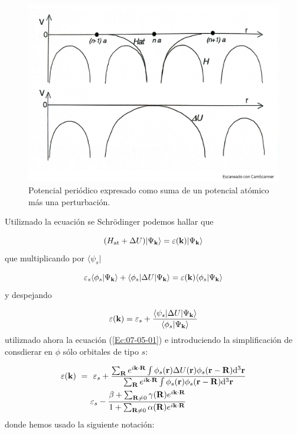 \begin{figure}[h!] \centering
    \includegraphics[scale=0.35]{Cuerpo/Ch_07/Fotos libro 5.pdf}
    \caption{Potencial periódico expresado como suma de un potencial atómico más una perturbación.}
    \label{Fig:07-05}
\end{figure}    
Utiliznado la ecuación se Schrödinger podemos hallar que

\begin{equation}
    (H_\text{at} + \Delta U) |\Psi_{\mathbf{k}} \rangle = \varepsilon(\mathbf{k}) |\Psi_{\mathbf{k}} \rangle
\end{equation}
que multiplicando por $\langle \psi_s |$   

\begin{equation}
    \varepsilon_s \langle \phi_s |\Psi_{\mathbf{k}} \rangle + \langle \phi_s | \Delta U |\Psi_{\mathbf{k}} \rangle = \varepsilon(\mathbf{k}) \langle \phi_s |\Psi_{\mathbf{k}} \rangle
\end{equation}
y despejando 

\begin{equation}
    \varepsilon(\mathbf{k}) = \varepsilon_s + \frac{\langle \psi_s |\Delta U | \Psi_{\mathbf{k}} \rangle}{\langle \phi_s |\Psi_{\mathbf{k}} \rangle}
\end{equation}
utiliznado ahora la ecuación (\ref{Ec:07-05-01}) e introduciendo la simplificación de consdierar en $\phi$ sólo orbitales de tipo $s$:

\begin{equation}
\begin{split}
    \varepsilon (\mathbf{k}) \ = \ & \ \varepsilon_s  + \frac{\sum_{\mathbf{R}} e^{i \mathbf{k} \cdot \mathbf{R} }\int \phi_s (\mathbf{r}) \Delta U (\mathbf{r}) \phi_s (\mathbf{r} - \mathbf{R}) \mathrm{d}^3 \mathbf{r} }{\sum_{\mathbf{R}} e^{i \mathbf{k} \cdot \mathbf{R} }\int \phi_s (\mathbf{r})\phi_s (\mathbf{r} - \mathbf{R}) \mathrm{d}^3 \mathbf{r} }\\
    & \varepsilon_s -  \frac{\beta + \sum_{\mathbf{R}\neq 0} \gamma(\mathbf{R}) e^{i\mathbf{k} \cdot \mathbf{R}}}{1+\sum_{\mathbf{R}\neq 0} \alpha (\mathbf{R}) e^{i\mathbf{k} \cdot \mathbf{R}}}
\end{split}
\end{equation}
donde hemos usado la siguiente notación: 

